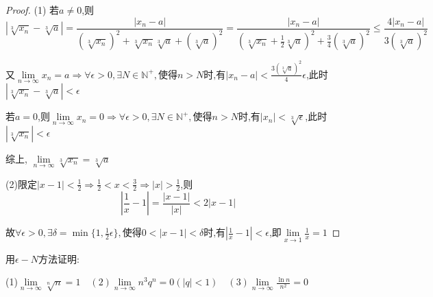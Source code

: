 \begin{proof}
    (1)
    若$a\ne 0$,则$$|\sqrt[3]{x_n}-\sqrt[3]{a}|
        =\frac{|x_n-a|}{(\sqrt[3]{x_n})^2+\sqrt[3]{x_n}\sqrt[3]{a}+(\sqrt[3]{a})^2}
        =\frac{|x_n-a|}{(\sqrt[3]{x_n}+\frac{1}{2}\sqrt[3]{a})^2+\frac{3}{4}(\sqrt[3]{a})^2}
        \le \frac{4|x_n-a|}{3(\sqrt[3]{a})^2}$$

    又$\lim \limits_{n \to \infty} x_n=a \Longrightarrow \forall
        \epsilon>0,\exists N \in \mathbb{N}^+,\mbox{使得}n>N\mbox{时,有}|x_n-a|<\frac{3(\sqrt[3]{a})^2}{4}\epsilon$,此时$|\sqrt[3]{x_n}-\sqrt[3]{a}|<\epsilon$

    若$a=0$,则$\lim \limits_{n \to \infty} x_n=0 \Longrightarrow \forall
        \epsilon>0,\exists N \in \mathbb{N}^+,\mbox{使得}n>N\mbox{时,有}|x_n|<\sqrt[3]{\epsilon}$,此时$|\sqrt[3]{x_n}|<\epsilon$

    综上, $\lim \limits_{n \to \infty} \sqrt[3]{x_n}=\sqrt[3]{a} $

    (2)限定$|x-1|<\frac{1}{2} \Longrightarrow \frac{1}{2}<x<\frac{3}{2} \Longrightarrow |x|>\frac{1}{2}$,则
    $$|\frac{1}{x}-1|=\frac{|x-1|}{|x|}<2|x-1|$$

    故$\forall \epsilon>0,\exists \delta=\min\{1,\frac{1}{2}\epsilon\},\mbox{使得}0<|x-1|<\delta\mbox{时,有}|\frac{1}{x}-1|<\epsilon$,即$\lim \limits_{x \to 1} \frac{1}{x}=1$
\end{proof}

\begin{exercise}
    用$\epsilon-N$方法证明:

    (1)$\lim \limits_{n \to \infty} \sqrt[n]{n}=1
        \quad (2)\lim \limits_{n \to \infty} n^3q^n=0(|q|<1)
        \quad(3) \lim \limits_{n \to \infty} \frac{\ln n}{n^2}=0$
\end{exercise}

